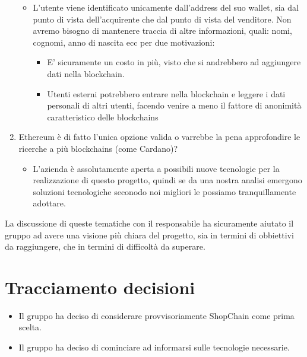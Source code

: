 \begin{enumerate}
            \begin{itemize}
                \item L'utente viene identificato unicamente dall'address del suo wallet, sia dal punto di vista dell'acquirente che dal punto di vista del venditore. Non avremo bisogno di
                      mantenere traccia di altre informazioni, quali: nomi, cognomi, anno di nascita ecc per due motivazioni:
                      \begin{itemize}
                          \item E' sicuramente un costo in più, visto che si andrebbero ad aggiungere dati nella blockchain.
                          \item Utenti esterni potrebbero entrare nella blockchain e leggere i dati personali di altri utenti, facendo venire a meno il fattore di anonimità caratteristico delle blockchains
                      \end{itemize}
            \end{itemize}
    \item Ethereum è di fatto l'unica opzione valida o varrebbe la pena approfondire le ricerche a più blockchains (come Cardano)?
            \begin{itemize}
                \item L'azienda è assolutamente aperta a possibili nuove tecnologie per la realizzazione di questo progetto, quindi se da una nostra analisi emergono soluzioni tecnologiche seconodo noi migliori
                      le possiamo tranquillamente adottare.
            \end{itemize}
\end{enumerate}
La discussione di queste tematiche con il responsabile ha sicuramente aiutato il gruppo ad avere una visione più chiara del progetto,
sia in termini di obbiettivi da raggiungere, che in termini di difficoltà da superare.
\section{Tracciamento decisioni}
\begin{itemize}
    \item Il gruppo ha deciso di considerare provvisoriamente ShopChain come prima scelta.
    \item Il gruppo ha deciso di cominciare ad informarsi sulle tecnologie necessarie.
\end{itemize}